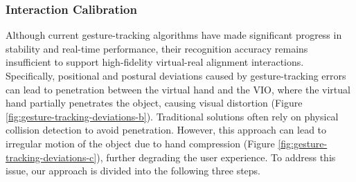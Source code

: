 \documentclass[runningheads]{llncs}
\begin{document}
\subsubsection{Interaction Calibration}
Although current gesture-tracking algorithms have made significant progress in stability and real-time performance, their recognition accuracy remains insufficient to support high-fidelity virtual-real alignment interactions. Specifically, positional and postural deviations caused by gesture-tracking errors can lead to penetration between the virtual hand and the VIO, where the virtual hand partially penetrates the object, causing visual distortion (Figure \ref{fig:gesture-tracking-deviations-b}). Traditional solutions often rely on physical collision detection to avoid penetration. However, this approach can lead to irregular motion of the object due to hand compression (Figure \ref{fig:gesture-tracking-deviations-c}), further degrading the user experience. To address this issue, our approach is divided into the following three steps.
\end{document}
